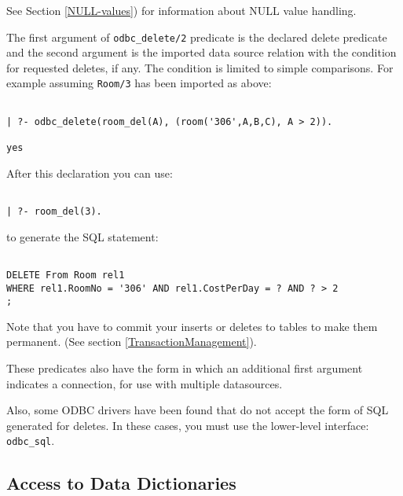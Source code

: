 See Section \ref{NULL-values}) for information about NULL value
handling.

The first argument of {\tt odbc\_delete/2} predicate is the declared delete
predicate and the second argument is the imported data source relation
with the condition for requested deletes, if any.  The condition is
limited to simple comparisons.  For example assuming
{\tt Room/3} has been imported as above:
\begin{verbatim}

| ?- odbc_delete(room_del(A), (room('306',A,B,C), A > 2)). 

yes
\end{verbatim}

After this declaration you can use:
\begin{verbatim}

| ?- room_del(3).
\end{verbatim}

to generate the SQL statement:
\begin{verbatim}

DELETE From Room rel1 
WHERE rel1.RoomNo = '306' AND rel1.CostPerDay = ? AND ? > 2
;
\end{verbatim}

Note that you have to commit your inserts or deletes to tables to make
them permanent.  (See section \ref{TransactionManagement}).

These predicates also have the form in which an additional first
argument indicates a connection, for use with multiple datasources.

Also, some ODBC drivers have been found that do not accept the form of
SQL generated for deletes.  In these cases, you must use the
lower-level interface: {\tt odbc\_sql}.

\subsection{Access to Data Dictionaries}

